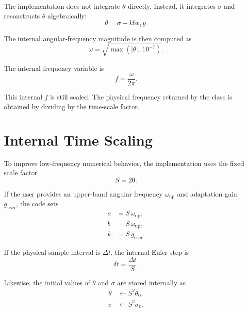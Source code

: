 \documentclass[conference]{IEEEtran}
\begin{document}
    The implementation does not integrate $\theta$ directly. Instead, it
    integrates $\sigma$ and reconstructs $\theta$ algebraically:
    \begin{equation}
        \theta = \sigma + k b x_1 y.
    \end{equation}

    The internal angular-frequency magnitude is then computed as
    \begin{equation}
        \omega = \sqrt{\max\!\left(|\theta|,\,10^{-7}\right)}.
    \end{equation}

    The internal frequency variable is
    \begin{equation}
        f = \frac{\omega}{2\pi}.
    \end{equation}

    This internal $f$ is still scaled. The physical frequency returned by the
    class is obtained by dividing by the time-scale factor.

    \section{Internal Time Scaling}

    To improve low-frequency numerical behavior, the implementation uses the fixed
    scale factor
    \begin{equation}
        S = 20.
    \end{equation}

    If the user provides an upper-band angular frequency $\omega_{\text{up}}$
    and adaptation gain $g_{\text{user}}$, the code sets
    \begin{align}
        a &= S\,\omega_{\text{up}},\\
        b &= S\,\omega_{\text{up}},\\
        k &= S\,g_{\text{user}}.
    \end{align}

    If the physical sample interval is $\Delta t$, the internal Euler step is
    \begin{equation}
        \delta t = \frac{\Delta t}{S}.
    \end{equation}

    Likewise, the initial values of $\theta$ and $\sigma$ are stored internally as
    \begin{align}
        \theta &\leftarrow S^2 \theta_0,\\
        \sigma &\leftarrow S^2 \sigma_0.
    \end{align}
\end{document}

